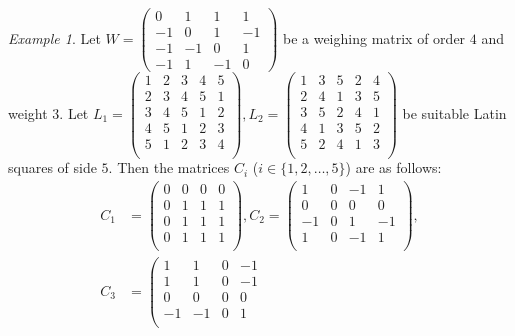 \documentclass[12pt]{article}
\theoremstyle{remark}
\newtheorem{ex}[thm]{Example}
\begin{document}
\begin{ex}
Let $W=
\left(
\begin{array}{rrrrr}
    0 & 1 & 1 & 1 \\ 
    -1 & 0 & 1 & -1 \\  
    -1 & -1 & 0 & 1 \\ 
    -1 & 1 & -1 & 0 
\end{array}
\right)
$ be a weighing matrix of order $4$ and weight $3$. 
Let $L_1=\left(
\begin{array}{rrrrr}
 1 & 2 & 3 & 4 & 5 \\
 2 & 3 & 4 & 5 & 1 \\
 3 & 4 & 5 & 1 & 2 \\
 4 & 5 & 1 & 2 & 3 \\
 5 & 1 & 2 & 3 & 4 \\
\end{array}
\right), L_2=\left(
\begin{array}{rrrrr}
 1 & 3 & 5 & 2 & 4 \\
 2 & 4 & 1 & 3 & 5 \\
 3 & 5 & 2 & 4 & 1 \\
 4 & 1 & 3 & 5 & 2 \\
 5 & 2 & 4 & 1 & 3 \\
\end{array}
\right)$ be suitable Latin squares of side $5$. 
Then the matrices $C_i$ ($i\in\{1,2,\ldots,5\}$) are as follows: 
\begin{align*}
    C_1&=\left(
\begin{array}{rrrrr}
 0 & 0 & 0 & 0 \\
 0 & 1 & 1 & 1 \\
 0 & 1 & 1 & 1 \\
 0 & 1 & 1 & 1 \\
\end{array}
\right),
    C_2=\left(
\begin{array}{rrrrr}
 1 & 0 & -1 & 1 \\
 0 & 0 & 0 & 0 \\
 -1 & 0 & 1 & -1 \\
 1 & 0 & -1 & 1 \\
\end{array}
\right),
\\
    C_3&=\left(
\begin{array}{rrrrr}
 1 & 1 & 0 & -1 \\
 1 & 1 & 0 & -1 \\
 0 & 0 & 0 & 0 \\
 -1 & -1 & 0 & 1 \\

\end{array}
\end{align*}
\end{ex}
\end{document}
